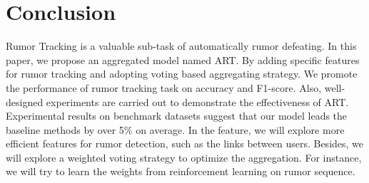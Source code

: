 \section{Conclusion}
\label{sec:conclusion}
Rumor Tracking is a valuable sub-task of automatically rumor defeating. In this paper, we propose an aggregated model named ART.  By adding specific features for rumor tracking and adopting voting based aggregating strategy. We promote the performance of rumor tracking task on accuracy and F1-score. Also, well-designed experiments are carried out to demonstrate the effectiveness of ART. Experimental results on benchmark datasets suggest that our model leads the baseline methods by over 5\% on average. In the feature, we will explore more efficient features for rumor detection, such as the links between users. Besides, we will explore a weighted voting strategy to optimize the aggregation. For instance, we will try to learn the weights from reinforcement learning on rumor sequence.